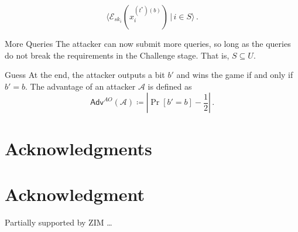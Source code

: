 \documentclass[10pt,journal,compsoc]{IEEEtran}
\theoremstyle{definition}
\theoremstyle{definition}
\theoremstyle{remark}
\begin{document}
\begin{LaTeXdescription}
\begin{equation*}
        \langle\mathcal{E}_{sk_i}(x^{(t^*)(b)}_i)\,|\,i\in S\rangle\,.
    \end{equation*}
    \item[More Queries] The attacker can now submit more queries, so long as the queries do not break the requirements in the Challenge stage. That is, $S \subseteq U$.
    \item[Guess] At the end, the attacker outputs a bit $b'$ and wins the game if and only if $b' = b$. The advantage of an attacker $\mathcal{A}$ is defined as
    \begin{equation*}
        \mathsf{Adv}^{AO}(\mathcal{A}) \coloneqq \left\lvert \Pr [b'=b] - \frac{1}{2}\right\rvert\,.
    \end{equation*} 
\end{LaTeXdescription}


\ifCLASSOPTIONcompsoc
  \section*{Acknowledgments}
\else
  \section*{Acknowledgment}
\fi


Partially supported by ZIM \dots


\ifCLASSOPTIONcaptionsoff
  \newpage
\fi




\end{document}
